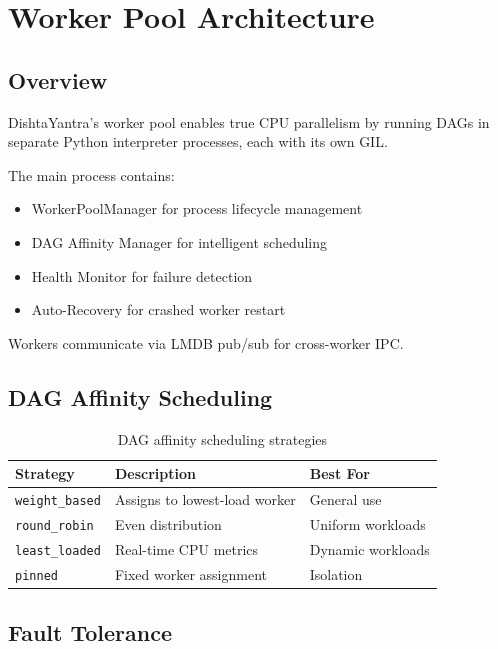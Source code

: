 \documentclass[11pt,a4paper]{article}
\begin{document}
\section{Worker Pool Architecture}

\subsection{Overview}

DishtaYantra's worker pool enables true CPU parallelism by running DAGs in separate Python interpreter processes, each with its own GIL.

The main process contains:
\begin{itemize}
    \item WorkerPoolManager for process lifecycle management
    \item DAG Affinity Manager for intelligent scheduling
    \item Health Monitor for failure detection
    \item Auto-Recovery for crashed worker restart
\end{itemize}

Workers communicate via LMDB pub/sub for cross-worker IPC.

\subsection{DAG Affinity Scheduling}

\begin{table}[H]
\centering
\caption{DAG affinity scheduling strategies}
\begin{tabular}{@{}lll@{}}
\toprule
\textbf{Strategy} & \textbf{Description} & \textbf{Best For} \\
\midrule
\texttt{weight\_based} & Assigns to lowest-load worker & General use \\
\texttt{round\_robin} & Even distribution & Uniform workloads \\
\texttt{least\_loaded} & Real-time CPU metrics & Dynamic workloads \\
\texttt{pinned} & Fixed worker assignment & Isolation \\
\bottomrule
\end{tabular}
\end{table}

\subsection{Fault Tolerance}
\end{document}
